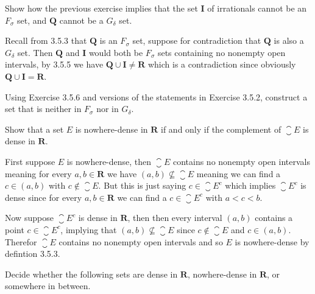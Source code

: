 \begin{exercise}
  Show how the previous exercise implies that the set $\mathbf I$ of irrationals cannot be an $F_{\sigma}$ set, and $\mathbf{Q}$ cannot be a $G_{\delta}$ set.
\end{exercise}

\begin{solution}
  Recall from 3.5.3 that $\mathbf Q$ is an $F_\sigma$ set, suppose for contradiction that $\mathbf Q$ is also a $G_\delta$ set. Then $\mathbf Q$ and $\mathbf I$ would both be $F_\sigma$ sets containing no nonempty open intervals, by 3.5.5 we have $\mathbf Q \cup \mathbf I \ne \mathbf R$ which is a contradiction since obviously $\mathbf Q \cup \mathbf I = \mathbf R$.
\end{solution}

\begin{exercise}
  Using Exercise 3.5.6 and versions of the statements in Exercise 3.5.2, construct a set that is neither in $F_{\sigma}$ nor in $G_{\delta}$.
\end{exercise}

\begin{solution}
  \TODO
\end{solution}

\begin{exercise}
  Show that a set $E$ is nowhere-dense in $\mathbf{R}$ if and only if the complement of $\closure{E}$ is dense in $\mathbf{R}$.
\end{exercise}

\begin{solution}
  First suppose $E$ is nowhere-dense, then $\closure{E}$ contains no nonempty open intervals meaning for every $a,b \in \mathbf R$ we have $(a,b) \not \subseteq \closure{E}$ meaning we can find a $c \in (a,b)$ with $c \notin \closure{E}$. But this is just saying $c \in \closure{E}^c$ which implies $\closure{E}^c$ is dense since for every $a,b \in \mathbf R$ we can find a $c \in \closure{E}^c$ with $a < c < b$.

  Now suppose $\closure{E}^c$ is dense in $\mathbf R$, then then every interval $(a,b)$ contains a point $c \in \closure{E}^c$, implying that $(a,b) \not \subseteq \closure{E}$ since $c \notin \closure{E}$ and $c \in (a,b)$. Therefor $\closure{E}$ contains no nonempty open intervals and so $E$ is nowhere-dense by defintion 3.5.3.
\end{solution}

\begin{exercise}
  Decide whether the following sets are dense in $\mathbf{R}$, nowhere-dense in $\mathbf{R}$, or somewhere in between.
\end{exercise}

